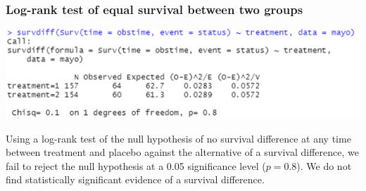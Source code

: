 \documentclass[10pt,t]{beamer}
\begin{document}
\begin{frame}
\frametitle{Log-rank test of equal survival between two groups }
\begin{center}
	\includegraphics[width=\textwidth]{figs/logrank_code.png}
\end{center}

Using a log-rank test of the null hypothesis of no survival difference at any time between treatment and placebo against the alternative of a survival difference, we fail to reject the null hypothesis at a 0.05 significance level ($p = 0.8$). We do not find statistically significant evidence of a survival difference. 

\end{frame}
\end{document}
